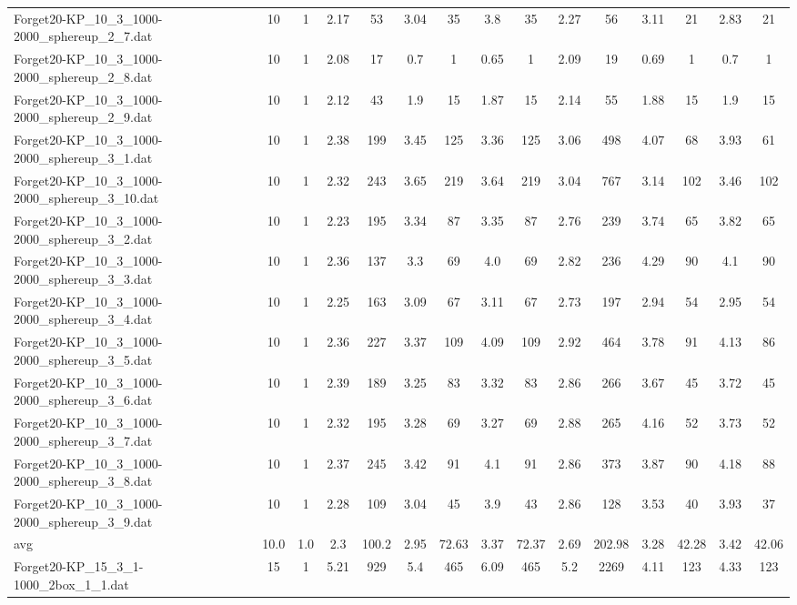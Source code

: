 \begin{table}[!ht]
{\begin{tabular}{lcccccccccccccc}
Forget20-KP\_10\_3\_1000-2000\_sphereup\_2\_7.dat & 10 & 1 & 2.17 & 53 & 3.04 & 35 & 3.8 & 35 & 2.27 & 56 & 3.11 & 21 & 2.83 & 21 \\
Forget20-KP\_10\_3\_1000-2000\_sphereup\_2\_8.dat & 10 & 1 & 2.08 & 17 & 0.7 & 1 & 0.65 & 1 & 2.09 & 19 & 0.69 & 1 & 0.7 & 1 \\
Forget20-KP\_10\_3\_1000-2000\_sphereup\_2\_9.dat & 10 & 1 & 2.12 & 43 & 1.9 & 15 & 1.87 & 15 & 2.14 & 55 & 1.88 & 15 & 1.9 & 15 \\
Forget20-KP\_10\_3\_1000-2000\_sphereup\_3\_1.dat & 10 & 1 & 2.38 & 199 & 3.45 & 125 & 3.36 & 125 & 3.06 & 498 & 4.07 & 68 & 3.93 & 61 \\
Forget20-KP\_10\_3\_1000-2000\_sphereup\_3\_10.dat & 10 & 1 & 2.32 & 243 & 3.65 & 219 & 3.64 & 219 & 3.04 & 767 & 3.14 & 102 & 3.46 & 102 \\
Forget20-KP\_10\_3\_1000-2000\_sphereup\_3\_2.dat & 10 & 1 & 2.23 & 195 & 3.34 & 87 & 3.35 & 87 & 2.76 & 239 & 3.74 & 65 & 3.82 & 65 \\
Forget20-KP\_10\_3\_1000-2000\_sphereup\_3\_3.dat & 10 & 1 & 2.36 & 137 & 3.3 & 69 & 4.0 & 69 & 2.82 & 236 & 4.29 & 90 & 4.1 & 90 \\
Forget20-KP\_10\_3\_1000-2000\_sphereup\_3\_4.dat & 10 & 1 & 2.25 & 163 & 3.09 & 67 & 3.11 & 67 & 2.73 & 197 & 2.94 & 54 & 2.95 & 54 \\
Forget20-KP\_10\_3\_1000-2000\_sphereup\_3\_5.dat & 10 & 1 & 2.36 & 227 & 3.37 & 109 & 4.09 & 109 & 2.92 & 464 & 3.78 & 91 & 4.13 & 86 \\
Forget20-KP\_10\_3\_1000-2000\_sphereup\_3\_6.dat & 10 & 1 & 2.39 & 189 & 3.25 & 83 & 3.32 & 83 & 2.86 & 266 & 3.67 & 45 & 3.72 & 45 \\
Forget20-KP\_10\_3\_1000-2000\_sphereup\_3\_7.dat & 10 & 1 & 2.32 & 195 & 3.28 & 69 & 3.27 & 69 & 2.88 & 265 & 4.16 & 52 & 3.73 & 52 \\
Forget20-KP\_10\_3\_1000-2000\_sphereup\_3\_8.dat & 10 & 1 & 2.37 & 245 & 3.42 & 91 & 4.1 & 91 & 2.86 & 373 & 3.87 & 90 & 4.18 & 88 \\
Forget20-KP\_10\_3\_1000-2000\_sphereup\_3\_9.dat & 10 & 1 & 2.28 & 109 & 3.04 & 45 & 3.9 & 43 & 2.86 & 128 & 3.53 & 40 & 3.93 & 37 \\
\hline avg & 10.0 & 1.0 & 2.3& 100.2 & 2.95& 72.63 & 3.37& 72.37 & 2.69& 202.98 & 3.28& 42.28 & 3.42& 42.06\\ \hline
Forget20-KP\_15\_3\_1-1000\_2box\_1\_1.dat & 15 & 1 & 5.21 & 929 & 5.4 & 465 & 6.09 & 465 & 5.2 & 2269 & 4.11 & 123 & 4.33 & 123 \\

\end{tabular}}
\end{table}
